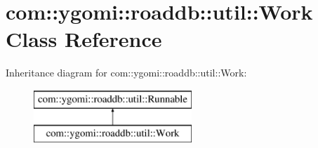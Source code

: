 \hypertarget{classcom_1_1ygomi_1_1roaddb_1_1util_1_1Work}{\section{com\-:\-:ygomi\-:\-:roaddb\-:\-:util\-:\-:Work Class Reference}
\label{classcom_1_1ygomi_1_1roaddb_1_1util_1_1Work}
}
Inheritance diagram for com\-:\-:ygomi\-:\-:roaddb\-:\-:util\-:\-:Work\-:\begin{figure}[H]
\begin{center}
\leavevmode
\includegraphics[height=2.000000cm]{classcom_1_1ygomi_1_1roaddb_1_1util_1_1Work}
\end{center}
\end{figure}
